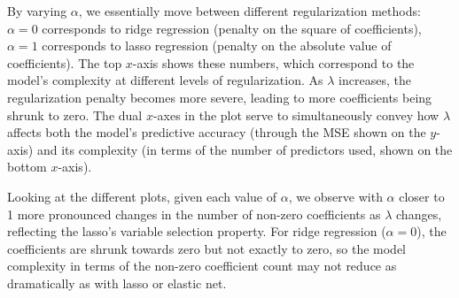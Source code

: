 \documentclass[
]{article}
\begin{document}
By varying \(\alpha\), we essentially move between different
regularization methods: \(\alpha = 0\) corresponds to ridge regression
(penalty on the square of coefficients), \(\alpha = 1\) corresponds to
lasso regression (penalty on the absolute value of coefficients). The
top \(x\)-axis shows these numbers, which correspond to the model's
complexity at different levels of regularization. As \(\lambda\)
increases, the regularization penalty becomes more severe, leading to
more coefficients being shrunk to zero. The dual \(x\)-axes in the plot
serve to simultaneously convey how \(\lambda\) affects both the model's
predictive accuracy (through the MSE shown on the \(y\)-axis) and its
complexity (in terms of the number of predictors used, shown on the
bottom \(x\)-axis).

Looking at the different plots, given each value of \(\alpha\), we
observe with \(\alpha\) closer to 1 more pronounced changes in the
number of non-zero coefficients as \(\lambda\) changes, reflecting the
lasso's variable selection property. For ridge regression
(\(\alpha = 0\)), the coefficients are shrunk towards zero but not
exactly to zero, so the model complexity in terms of the non-zero
coefficient count may not reduce as dramatically as with lasso or
elastic net.
\end{document}

